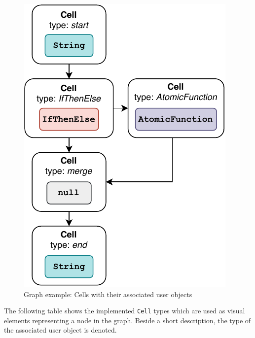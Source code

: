 \documentclass[a4paper,top=25mm,bottom=25mm,12pt,pdftex,halfparskip,twoside,bibtotoc,numbers=noenddot]{scrbook}
\begin{document}
\begin{figure}[H]
  \centering
  \vspace{0.5cm}
  \includegraphics[]{cell-user-objects}
  \caption{Graph example: Cells with their associated user objects}
\end{figure}

\newpage

The following table shows the implemented \texttt{Cell} types which are used as visual elements representing a node in the graph. Beside a short description, the type of the associated user object is denoted.
\end{document}
